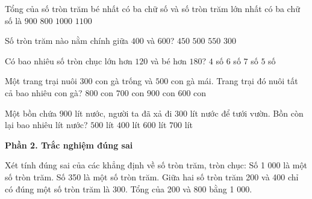 \begin{ex} %
Tổng của số tròn trăm bé nhất có ba chữ số và số tròn trăm lớn nhất có ba chữ số là
\choice
{$900$}
{$800$}
{\True $1 000$}
{$1 100$}
\end{ex}

\begin{ex} %
Số tròn trăm nào nằm chính giữa $400$ và $600$?
\choice
{$450$}
{\True $500$}
{$550$}
{$300$}
\end{ex}

\begin{ex} %
Có bao nhiêu số tròn chục lớn hơn $120$ và bé hơn $180$?
\choice
{$4$ số}
{$6$ số}
{$7$ số}
{\True $5$ số}
\end{ex}

\begin{ex} %
Một trang trại nuôi $300$ con gà trống và $500$ con gà mái. Trang trại đó nuôi tất cả bao nhiêu con gà?
\choice
{\True $800$ con}
{$700$ con}
{$900$ con}
{$600$ con}
\end{ex}

\begin{ex} %
Một bồn chứa $900$ lít nước, người ta đã xả đi $300$ lít nước để tưới vườn. Bồn còn lại bao nhiêu lít nước?
\choice
{$500$ lít}
{$400$ lít}
{\True $600$ lít}
{$700$ lít}
\end{ex}

\textbf{Phần 2. Trắc nghiệm đúng sai}

\begin{ex} %
Xét tính đúng sai của các khẳng định về số tròn trăm, tròn chục:
\choiceTF
{\True Số 1 000 là một số tròn trăm.}
{Số 350 là một số tròn trăm.}
{\True Giữa hai số tròn trăm 200 và 400 chỉ có đúng một số tròn trăm là 300.}
{\True Tổng của 200 và 800 bằng 1 000.}
\end{ex}

